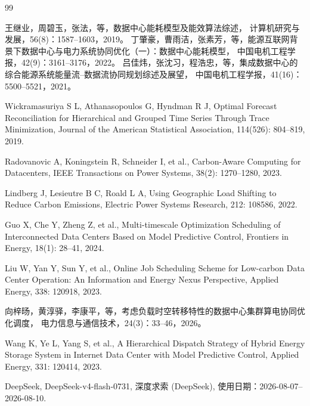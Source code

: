 \begin{thebibliography}{99}
	\RaggedRight
	
	\setlength{\itemsep}{0pt}
	\setlength{\parskip}{0pt}
	\setlength{\parsep}{0pt}
	
	\linespread{1.5}\selectfont
	
	\setlength{\emergencystretch}{2em}
	
	王继业，周碧玉，张法，等，数据中心能耗模型及能效算法综述，
	计算机研究与发展，56(8)：1587--1603，2019。	
	丁肇豪，曹雨洁，张素芳，等，能源互联网背景下数据中心与电力系统协同优化（一）：数据中心能耗模型，
	中国电机工程学报，42(9)：3161--3176，2022。	
	吕佳炜，张沈习，程浩忠，等，集成数据中心的综合能源系统能量流--数据流协同规划综述及展望，
	中国电机工程学报，41(16)：5500--5521，2021。
	
	Wickramasuriya S L, Athanasopoulos G, Hyndman R J,
	Optimal Forecast Reconciliation for Hierarchical and Grouped Time Series Through Trace Minimization,
	Journal of the American Statistical Association, 114(526): 804--819, 2019.
	
	Radovanovic A, Koningstein R, Schneider I, et al.,
	Carbon-Aware Computing for Datacenters,
	IEEE Transactions on Power Systems, 38(2): 1270--1280, 2023.
	
	Lindberg J, Lesieutre B C, Roald L A,
	Using Geographic Load Shifting to Reduce Carbon Emissions,
	Electric Power Systems Research, 212: 108586, 2022.
	
	Guo X, Che Y, Zheng Z, et al.,
	Multi-timescale Optimization Scheduling of Interconnected Data Centers Based on Model Predictive Control,
	Frontiers in Energy, 18(1): 28--41, 2024.
	
	Liu W, Yan Y, Sun Y, et al.,
	Online Job Scheduling Scheme for Low-carbon Data Center Operation: An Information and Energy Nexus Perspective,
	Applied Energy, 338: 120918, 2023.
	
	向梓旸，黄淳驿，李康平，等，考虑负载时空转移特性的数据中心集群算电协同优化调度，
	电力信息与通信技术，24(3)：33--46，2026。
	
	Wang K, Ye L, Yang S, et al.,
	A Hierarchical Dispatch Strategy of Hybrid Energy Storage System in Internet Data Center with Model Predictive Control,
	Applied Energy, 331: 120414, 2023.

	DeepSeek, DeepSeek-v4-flash-0731, 深度求索 (DeepSeek), 使用日期：2026-08-07--2026-08-10.
	
\end{thebibliography}

